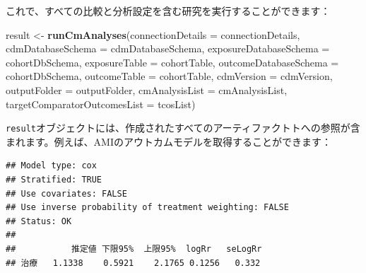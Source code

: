\documentclass[
  11pt]{book}
\newenvironment{Shaded}{\begin{snugshade}}{\end{snugshade}}
\newcommand{\AttributeTok}[1]{\textcolor[rgb]{0.13,0.29,0.53}{#1}}
\newcommand{\DecValTok}[1]{\textcolor[rgb]{0.00,0.00,0.81}{#1}}
\newcommand{\FunctionTok}[1]{\textcolor[rgb]{0.13,0.29,0.53}{\textbf{#1}}}
\newcommand{\NormalTok}[1]{#1}
\newcommand{\OtherTok}[1]{\textcolor[rgb]{0.56,0.35,0.01}{#1}}
\newcommand{\SpecialCharTok}[1]{\textcolor[rgb]{0.81,0.36,0.00}{\textbf{#1}}}
\theoremstyle{definition}
\theoremstyle{definition}
\theoremstyle{definition}
\theoremstyle{definition}
\theoremstyle{remark}
\begin{document}
これで、すべての比較と分析設定を含む研究を実行することができます：

\begin{Shaded}
\begin{Highlighting}[]
\NormalTok{result }\OtherTok{\textless{}{-}} \FunctionTok{runCmAnalyses}\NormalTok{(}\AttributeTok{connectionDetails =}\NormalTok{ connectionDetails,}
                        \AttributeTok{cdmDatabaseSchema =}\NormalTok{ cdmDatabaseSchema,}
                        \AttributeTok{exposureDatabaseSchema =}\NormalTok{ cohortDbSchema,}
                        \AttributeTok{exposureTable =}\NormalTok{ cohortTable,}
                        \AttributeTok{outcomeDatabaseSchema =}\NormalTok{ cohortDbSchema,}
                        \AttributeTok{outcomeTable =}\NormalTok{ cohortTable,}
                        \AttributeTok{cdmVersion =}\NormalTok{ cdmVersion,}
                        \AttributeTok{outputFolder =}\NormalTok{ outputFolder,}
                        \AttributeTok{cmAnalysisList =}\NormalTok{ cmAnalysisList,}
                        \AttributeTok{targetComparatorOutcomesList =}\NormalTok{ tcosList)}
\end{Highlighting}
\end{Shaded}

\texttt{result}オブジェクトには、作成されたすべてのアーティファクトトへの参照が含まれます。例えば、AMIのアウトカムモデルを取得することができます：

\begin{Shaded}
\end{Shaded}

\begin{verbatim}
## Model type: cox
## Stratified: TRUE
## Use covariates: FALSE
## Use inverse probability of treatment weighting: FALSE
## Status: OK
## 
##           推定値 下限95%  上限95%  logRr   seLogRr
## 治療   1.1338    0.5921    2.1765 0.1256   0.332
\end{verbatim}
\end{document}
